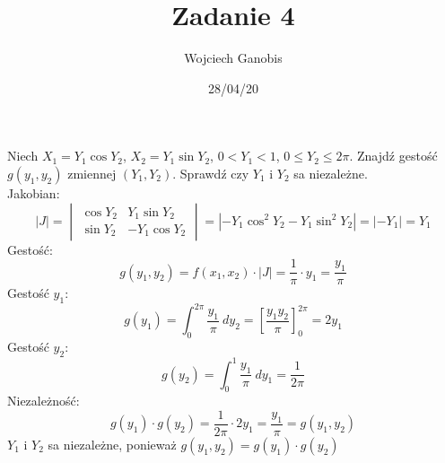 \documentclass[12pt]{article}
\title{Zadanie 4}
\author{Wojciech Ganobis}
\date{28/04/20}
\begin{document}
\maketitle
Niech $X_1=Y_1\cos{Y_2}$, $X_2=Y_1\sin{Y_2}$, $0<Y_1<1$, $0\leq Y_2 \leq 2\pi$. Znajdź gestość $g(y_1,y_2)$ zmiennej $(Y_1,Y_2)$. Sprawdź czy $Y_1$ i $Y_2$ sa niezależne.\\


Jakobian:
$$|J|=\begin{vmatrix}
\cos{Y_2} & Y_1\sin{Y_2}\\
\sin{Y_2} & -Y_1\cos{Y_2}
\end{vmatrix} = | -Y_1\cos^2{Y_2} - Y_1\sin^2{Y_2} | = |-Y_1| = Y_1$$
Gestość:
$$g(y_1,y_2)=f(x_1,x_2)\cdot |J| = \frac{1}{\pi} \cdot y_1 = \frac{y_1}{\pi} $$
Gestość $y_1$:
$$g(y_1)=\int_0^{2\pi} \frac{y_1}{\pi}\ dy_2 = \left[ \frac{y_1 y_2}{\pi} \right]_{0}^{2\pi} = 2y_1 $$
Gestość $y_2$:
$$g(y_2)=\int_0^1 \frac{y_1}{\pi}\ dy_1 = \frac{1}{2\pi} $$
Niezależność:
$$g(y_1) \cdot g(y_2) = \frac{1}{2\pi} \cdot 2y_1 = \frac{y_1}{\pi} = g(y_1,y_2)$$
$Y_{1}$ i $ Y_{2}$ sa niezależne, ponieważ $g(y_1,y_2)= g(y_1) \cdot g(y_2)$
\end{document}
